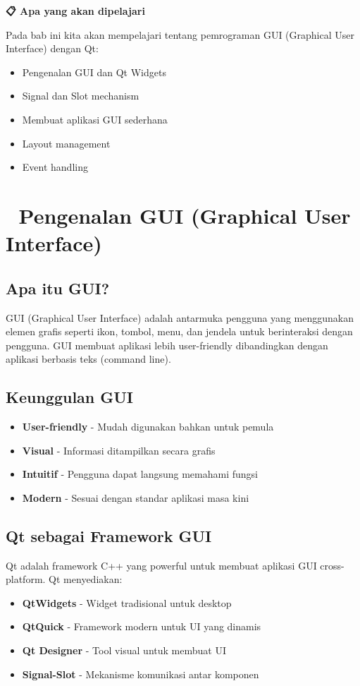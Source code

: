 \textbf{📋 Apa yang akan dipelajari}

Pada bab ini kita akan mempelajari tentang pemrograman GUI (Graphical User Interface) dengan Qt:

\begin{itemize}
\item Pengenalan GUI dan Qt Widgets
\item Signal dan Slot mechanism
\item Membuat aplikasi GUI sederhana
\item Layout management
\item Event handling
\end{itemize}

\minitoc

\section{🎨 Pengenalan GUI (Graphical User Interface)}

\subsection{Apa itu GUI?}

GUI (Graphical User Interface) adalah antarmuka pengguna yang menggunakan elemen grafis seperti ikon, tombol, menu, dan jendela untuk berinteraksi dengan pengguna. GUI membuat aplikasi lebih user-friendly dibandingkan dengan aplikasi berbasis teks (command line).

\subsection{Keunggulan GUI}

\begin{itemize}
\item \textbf{User-friendly} - Mudah digunakan bahkan untuk pemula
\item \textbf{Visual} - Informasi ditampilkan secara grafis
\item \textbf{Intuitif} - Pengguna dapat langsung memahami fungsi
\item \textbf{Modern} - Sesuai dengan standar aplikasi masa kini
\end{itemize}

\subsection{Qt sebagai Framework GUI}

Qt adalah framework C++ yang powerful untuk membuat aplikasi GUI cross-platform. Qt menyediakan:
\begin{itemize}
\item \textbf{QtWidgets} - Widget tradisional untuk desktop
\item \textbf{QtQuick} - Framework modern untuk UI yang dinamis
\item \textbf{Qt Designer} - Tool visual untuk membuat UI
\item \textbf{Signal-Slot} - Mekanisme komunikasi antar komponen
\end{itemize}

